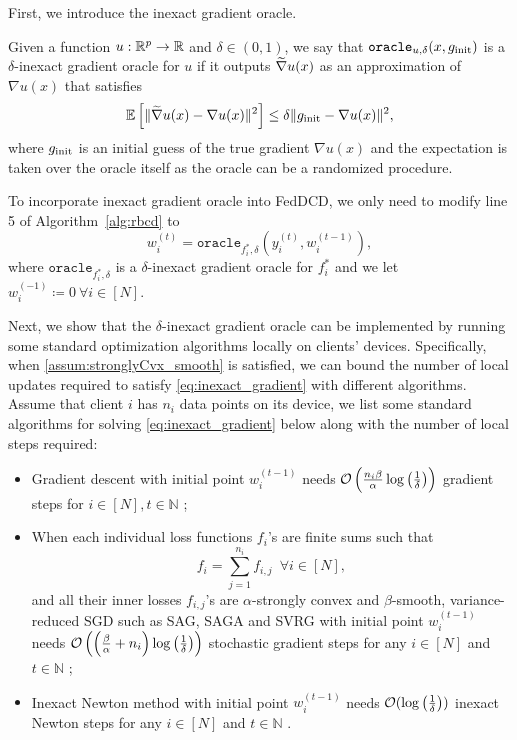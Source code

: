 First, we introduce the inexact gradient oracle. 
\begin{definition} 
Given a function $u : \mathbb{R}^p \to \mathbb{R}$ and $\delta \in (0,1)$, we say that $\texttt{oracle}_{u, \delta}(x, g_{\mathrm{init}})$ is a $\delta$-inexact gradient oracle for $u$ if it outputs $\widetilde{\nabla} u(x)$ as an approximation of $\nabla u(x)$ that satisfies
\begin{align}
        \mathbb{E}\left[\| \widetilde{\nabla} u(x) - {\nabla} u(x) \|^2\right] \leq \delta \| g_{\mathrm{init}} - {\nabla} u(x) \|^2, \label{eq:inexactOracle1}
\end{align}
where $g_{\mathrm{init}}$ is an initial guess of the true gradient $\nabla u(x)$ and the expectation is taken over the oracle itself as the oracle can be a randomized procedure.
\end{definition}
To incorporate inexact gradient oracle into FedDCD, we only need to modify line 5 of Algorithm~\ref{alg:rbcd} to
\begin{equation} \label{eq:inexact_gradient}
    w_i^{(t)} = \texttt{oracle}_{f_i^*, \delta}(y^{(t)}_i, w_{i}^{(t-1)}),
\end{equation}
where $\texttt{oracle}_{f_i^*, \delta}$ is a $\delta$-inexact gradient oracle for $f_i^*$ and 
we let $w_i^{(-1)} \coloneqq 0~\forall i \in [N]$.

Next, we show that the $\delta$-inexact gradient oracle can be implemented by running some standard optimization algorithms locally on clients' devices. Specifically, when \autoref{assum:stronglyCvx_smooth} is satisfied, we can bound the number of local updates required to satisfy \eqref{eq:inexact_gradient} with different algorithms. Assume that client $i$ has $n_i$ data points on its device, we list some standard algorithms for solving \eqref{eq:inexact_gradient} below along with the number of local steps required:
\begin{itemize}
    \item Gradient descent with initial point $w_i^{(t-1)}$ needs $\mathcal{O}\left( \frac{ n_i \beta}{\alpha} \log\left( \frac{1}{\delta} \right) \right)$ gradient steps for $i \in [N], t \in \mathbb{N}$ \citep{cvxopt_lecture};
    \item When each individual loss functions $f_i$'s are finite sums such that 
    \[f_i = \sum_{j=1}^{n_i} f_{i,j} \enspace \forall i \in [N],\] 
    and all their inner losses $f_{i,j}$'s are $\alpha$-strongly convex and $\beta$-smooth, variance-reduced SGD such as SAG, SAGA and SVRG with initial point $w^{(t-1)}_i$ needs $\mathcal{O}\left( \left( \frac{\beta}{\alpha} + n_i \right) \log\left( \frac{1}{\delta} \right) \right)$ stochastic gradient steps for any $i \in [N]$ and $t \in \mathbb{N}$ \citep{roux2012stochastic,JohnsonZ13,DefazioBL14};
    \item Inexact Newton method with initial point $w^{(t-1)}_i$ needs $\mathcal{O}( \log\left( \frac{1}{\delta} \right) )$ inexact Newton steps for any $i \in [N] $ and $t \in \mathbb{N}$ \citep{dembo1982inexact}.
\end{itemize}

